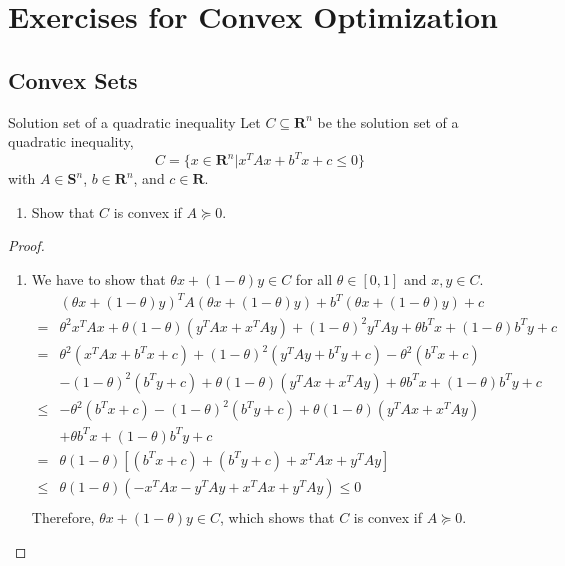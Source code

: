 \chapter{Exercises for Convex Optimization}

\section{Convex Sets}

\begin{exercise}{Solution set of a quadratic inequality}
    Let $C\subseteq\mathbf{R}^{n}$ be the solution set of a quadratic inequality,
    \begin{equation*}
        C=\{x\in\mathbf{R}^{n}\vert x^{T}Ax+b^{T}x+c\leq 0\}
    \end{equation*}
    with $A\in\mathbf{S}^{n}$, $b\in\mathbf{R}^{n}$, and $c\in\mathbf{R}$.
    \begin{enumerate}
        \item Show that $C$ is convex if $A\succeq 0$.
    \end{enumerate}
\end{exercise}

\begin{proof}
    \begin{enumerate}
        \item
              We have to show that $\theta x+(1-\theta)y\in C$ for all $\theta\in[0,1]$ and $x,y\in C$.
              \begin{equation*}
                  \begin{aligned}
                           & (\theta x+(1-\theta)y)^{T}A(\theta x+(1-\theta)y)+b^{T}(\theta x+(1-\theta)y)+c            \\
                      =    & \theta^2x^TAx+\theta(1-\theta)(y^TAx+x^TAy)+(1-\theta)^2y^TAy+\theta b^Tx+(1-\theta)b^Ty+c \\
                      =    & \theta^2(x^{T}Ax+b^{T}x+c)+(1-\theta)^2(y^{T}Ay+b^{T}y+c)-\theta^2(b^{T}x+c)               \\
                           & -(1-\theta)^2(b^{T}y+c)+\theta(1-\theta)(y^TAx+x^TAy)+\theta b^Tx+(1-\theta)b^Ty+c         \\
                      \leq & -\theta^2(b^{T}x+c)-(1-\theta)^2(b^{T}y+c)+\theta(1-\theta)(y^TAx+x^TAy)                   \\
                           & +\theta b^Tx+(1-\theta)b^Ty+c                                                              \\
                      =    & \theta(1-\theta)[(b^Tx+c)+(b^Ty+c)+x^TAx+y^TAy]                                            \\
                      \leq & \theta(1-\theta)(-x^TAx-y^TAy+x^TAx+y^TAy)\leq 0                                           \\
                  \end{aligned}
              \end{equation*}
              Therefore, $\theta x+(1-\theta)y\in C$, which shows that $C$ is convex if $A\succeq 0$.
    \end{enumerate}

\end{proof}